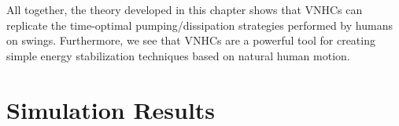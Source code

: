 All together, the theory developed in this chapter shows that VNHCs can
replicate the time-optimal pumping/dissipation strategies performed by humans on
swings.
Furthermore, we see that VNHCs are a powerful tool for creating simple energy
stabilization techniques based on natural human motion.

\section{Simulation Results}

